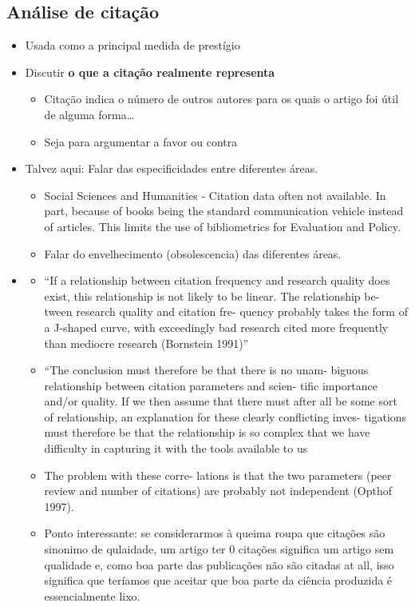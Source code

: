 \documentclass[11pt]{article}
\begin{document}
\subsection{Análise de citação}
\label{sec:org41326e9}
\begin{itemize}
\item Usada como a principal medida de prestígio
\item Discutir \textbf{o que a citação realmente representa}
\begin{itemize}
\item Citação indica o número de outros autores para os quais o artigo foi útil de alguma forma\ldots{}
\item Seja para argumentar a favor ou contra
\end{itemize}
\item Talvez aqui: Falar das especificidades entre diferentes áreas.
\begin{itemize}
\item Social Sciences and Humanities - Citation data often not available. In part, because of books being the standard communication vehicle instead of articles. This limits the use of bibliometrics for Evaluation and Policy. \cite{mingers2015}
\item Falar do envelhecimento (obsolescencia) das diferentes áreas.
\end{itemize}

\item \cite{wallin2005}
\begin{itemize}
\item “If a relationship between citation frequency and research quality does exist, this relationship is not likely to be linear. The relationship be- tween research quality and citation fre- quency probably takes the form of a J-shaped curve, with exceedingly bad research cited more frequently than mediocre research (Bornstein 1991)”
\item “The conclusion must therefore be that there is no unam- biguous relationship between citation parameters and scien- tific importance and/or quality. If we then assume that there must after all be some sort of relationship, an explanation for these clearly conflicting inves- tigations must therefore be that the relationship is so complex that we have difficulty in capturing it with the tools available to us
\item The problem with these corre- lations is that the two parameters (peer review and number of citations) are probably not independent (Opthof 1997).
\item Ponto interessante: se considerarmos à queima roupa que citações são sinonimo de qulaidade, um artigo ter 0 citações significa um artigo sem qualidade e, como boa parte das publicações não são citadas at all, isso significa que teríamos que aceitar que boa parte da ciência produzida é essencialmente lixo.
\end{itemize}
\end{itemize}
\end{document}
